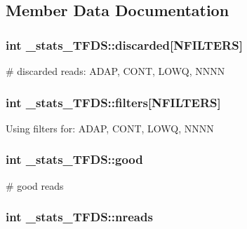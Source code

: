 \subsection{Member Data Documentation}
\hypertarget{struct__stats__TFDS_a1a48e89c58bc7216e40eda1828585512}{
\subsubsection[{discarded}]{\setlength{\rightskip}{0pt plus 5cm}int \+\_\+stats\+\_\+\+T\+F\+D\+S\+::discarded\mbox{[}{\bf N\+F\+I\+L\+T\+E\+R\+S}\mbox{]}}}\label{struct__stats__TFDS_a1a48e89c58bc7216e40eda1828585512}
\# discarded reads\+: A\+D\+A\+P, C\+O\+N\+T, L\+O\+W\+Q, N\+N\+N\+N \hypertarget{struct__stats__TFDS_a8272cc0b600f4d7bd8e61f7d22afff50}{
\subsubsection[{filters}]{\setlength{\rightskip}{0pt plus 5cm}int \+\_\+stats\+\_\+\+T\+F\+D\+S\+::filters\mbox{[}{\bf N\+F\+I\+L\+T\+E\+R\+S}\mbox{]}}}\label{struct__stats__TFDS_a8272cc0b600f4d7bd8e61f7d22afff50}
Using filters for\+: A\+D\+A\+P, C\+O\+N\+T, L\+O\+W\+Q, N\+N\+N\+N \hypertarget{struct__stats__TFDS_a2f3493a18118ed55ef04435439b9f0bd}{
\subsubsection[{good}]{\setlength{\rightskip}{0pt plus 5cm}int \+\_\+stats\+\_\+\+T\+F\+D\+S\+::good}}\label{struct__stats__TFDS_a2f3493a18118ed55ef04435439b9f0bd}
\# good reads \hypertarget{struct__stats__TFDS_ab49cef985df92c496c0c673d32ec74c4}{
\subsubsection[{nreads}]{\setlength{\rightskip}{0pt plus 5cm}int \+\_\+stats\+\_\+\+T\+F\+D\+S\+::nreads}}\label{struct__stats__TFDS_ab49cef985df92c496c0c673d32ec74c4}
